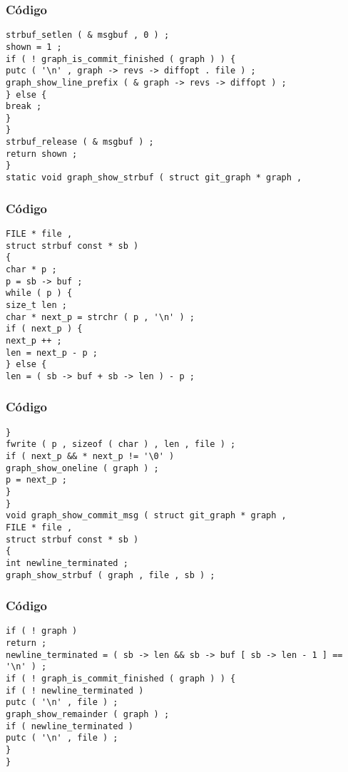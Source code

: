 \documentclass{beamer}
\begin{document}
\begin{frame}[fragile]
\frametitle{C\'odigo}
\begin{verbatim}
strbuf_setlen ( & msgbuf , 0 ) ; 
shown = 1 ; 
if ( ! graph_is_commit_finished ( graph ) ) { 
putc ( '\n' , graph -> revs -> diffopt . file ) ; 
graph_show_line_prefix ( & graph -> revs -> diffopt ) ; 
} else { 
break ; 
} 
} 
strbuf_release ( & msgbuf ) ; 
return shown ; 
} 
static void graph_show_strbuf ( struct git_graph * graph , 
\end{verbatim}
\end{frame}
\begin{frame}[fragile]
\frametitle{C\'odigo}
\begin{verbatim}
FILE * file , 
struct strbuf const * sb ) 
{ 
char * p ; 
p = sb -> buf ; 
while ( p ) { 
size_t len ; 
char * next_p = strchr ( p , '\n' ) ; 
if ( next_p ) { 
next_p ++ ; 
len = next_p - p ; 
} else { 
len = ( sb -> buf + sb -> len ) - p ; 
\end{verbatim}
\end{frame}
\begin{frame}[fragile]
\frametitle{C\'odigo}
\begin{verbatim}
} 
fwrite ( p , sizeof ( char ) , len , file ) ; 
if ( next_p && * next_p != '\0' ) 
graph_show_oneline ( graph ) ; 
p = next_p ; 
} 
} 
void graph_show_commit_msg ( struct git_graph * graph , 
FILE * file , 
struct strbuf const * sb ) 
{ 
int newline_terminated ; 
graph_show_strbuf ( graph , file , sb ) ; 
\end{verbatim}
\end{frame}
\begin{frame}[fragile]
\frametitle{C\'odigo}
\begin{verbatim}
if ( ! graph ) 
return ; 
newline_terminated = ( sb -> len && sb -> buf [ sb -> len - 1 ] == '\n' ) ; 
if ( ! graph_is_commit_finished ( graph ) ) { 
if ( ! newline_terminated ) 
putc ( '\n' , file ) ; 
graph_show_remainder ( graph ) ; 
if ( newline_terminated ) 
putc ( '\n' , file ) ; 
} 
} \end{verbatim}
\end{frame}
\end{document}
